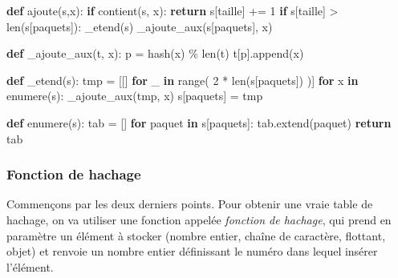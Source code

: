 \documentclass[a4paper,17pt]{extarticle}
\newenvironment{Shaded}{}{}
\newcommand{\KeywordTok}[1]{\textcolor[rgb]{0.00,0.44,0.13}{\textbf{{#1}}}}
\newcommand{\DecValTok}[1]{\textcolor[rgb]{0.25,0.63,0.44}{{#1}}}
\newcommand{\StringTok}[1]{\textcolor[rgb]{0.25,0.44,0.63}{{#1}}}
\newcommand{\NormalTok}[1]{{#1}}
\newcommand{\ControlFlowTok}[1]{\textcolor[rgb]{0.00,0.44,0.13}{\textbf{{#1}}}}
\newcommand{\OperatorTok}[1]{\textcolor[rgb]{0.40,0.40,0.40}{{#1}}}
\newcommand{\BuiltInTok}[1]{{#1}}
\begin{document}
\begin{retenir}
\begin{Shaded}
\begin{Highlighting}[]
\KeywordTok{def}\NormalTok{ ajoute(s,x):}
    \ControlFlowTok{if}\NormalTok{ contient(s, x):}
        \ControlFlowTok{return}
\NormalTok{    s[}\StringTok{\textquotesingle{}taille\textquotesingle{}}\NormalTok{] }\OperatorTok{+=} \DecValTok{1}
    \ControlFlowTok{if}\NormalTok{ s[}\StringTok{\textquotesingle{}taille\textquotesingle{}}\NormalTok{] }\OperatorTok{\textgreater{}} \BuiltInTok{len}\NormalTok{(s[}\StringTok{\textquotesingle{}paquets\textquotesingle{}}\NormalTok{]):}
\NormalTok{        \_etend(s)}
\NormalTok{    \_ajoute\_aux(s[}\StringTok{\textquotesingle{}paquets\textquotesingle{}}\NormalTok{], x)}

\KeywordTok{def}\NormalTok{ \_ajoute\_aux(t, x):}
\NormalTok{    p }\OperatorTok{=} \BuiltInTok{hash}\NormalTok{(x) }\OperatorTok{\%} \BuiltInTok{len}\NormalTok{(t)}
\NormalTok{    t[p].append(x)}

\KeywordTok{def}\NormalTok{ \_etend(s):}
\NormalTok{    tmp }\OperatorTok{=}\NormalTok{ [[] }\ControlFlowTok{for}\NormalTok{ \_ }\KeywordTok{in} \BuiltInTok{range}\NormalTok{( }\DecValTok{2} \OperatorTok{*} \BuiltInTok{len}\NormalTok{(s[}\StringTok{\textquotesingle{}paquets\textquotesingle{}}\NormalTok{]) )]}
    \ControlFlowTok{for}\NormalTok{ x }\KeywordTok{in}\NormalTok{ enumere(s):}
\NormalTok{        \_ajoute\_aux(tmp, x)}
\NormalTok{    s[}\StringTok{\textquotesingle{}paquets\textquotesingle{}}\NormalTok{] }\OperatorTok{=}\NormalTok{ tmp}

\KeywordTok{def}\NormalTok{ enumere(s):}
\NormalTok{    tab }\OperatorTok{=}\NormalTok{ []}
    \ControlFlowTok{for}\NormalTok{ paquet }\KeywordTok{in}\NormalTok{ s[}\StringTok{\textquotesingle{}paquets\textquotesingle{}}\NormalTok{]:}
\NormalTok{        tab.extend(paquet)}
    \ControlFlowTok{return}\NormalTok{ tab}
\end{Highlighting}
\end{Shaded}

        \end{retenir}
    \hypertarget{fonction-de-hachage}{%
\subsubsection{Fonction de hachage}\label{fonction-de-hachage}}

    Commençons par les deux derniers points. Pour obtenir une vraie table de
hachage, on va utiliser une fonction appelée \emph{fonction de hachage},
qui prend en paramètre un élément à stocker (nombre entier, chaîne de
caractère, flottant, objet) et renvoie un nombre entier définissant le
numéro dans lequel insérer l'élément.
\end{document}
